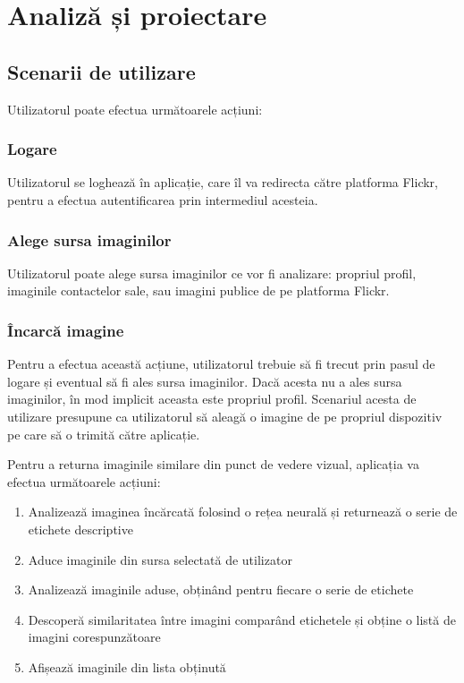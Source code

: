 \chapter{Analiză și proiectare}

\section{Scenarii de utilizare}

Utilizatorul poate efectua următoarele acțiuni:
\subsection{Logare}
Utilizatorul se loghează în aplicație, care îl va redirecta către platforma Flickr, pentru a efectua autentificarea prin intermediul acesteia.

\subsection{Alege sursa imaginilor}
Utilizatorul poate alege sursa imaginilor ce vor fi analizare: propriul profil, imaginile contactelor sale, sau imagini publice de pe platforma Flickr.

\subsection{Încarcă imagine}
Pentru a efectua această acțiune, utilizatorul trebuie să fi trecut prin pasul de logare și eventual să fi ales sursa imaginilor. Dacă acesta nu a ales sursa imaginilor, în mod implicit aceasta este propriul profil. Scenariul acesta de utilizare presupune ca utilizatorul să aleagă o imagine de pe propriul dispozitiv pe care să o trimită către aplicație.

Pentru a returna imaginile similare din punct de vedere vizual, aplicația va efectua următoarele acțiuni:
\begin{enumerate}
    \item Analizează imaginea încărcată folosind o rețea neurală și returnează o serie de etichete descriptive
    \item Aduce imaginile  din sursa selectată de utilizator
    \item Analizează imaginile aduse, obținând pentru fiecare o serie de etichete
    \item Descoperă similaritatea între imagini comparând etichetele și obține o listă de imagini corespunzătoare
    \item Afișează imaginile din lista obținută
\end{enumerate}{}

